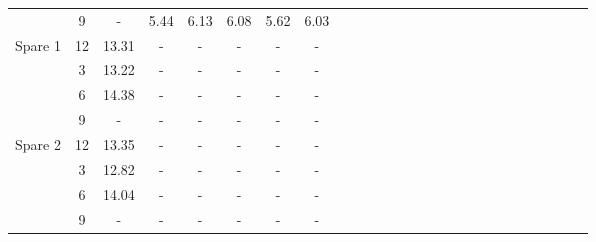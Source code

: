 \begin{table}[h]
{\begin{tabular}{l|l|l|l|l|l|l|lllllllllllllllllll}
			\multicolumn{1}{c|}{} & \multicolumn{1}{c|}{9} & \multicolumn{1}{c|}{-} & \multicolumn{1}{c|}{5.44} & \multicolumn{1}{c|}{6.13} & \multicolumn{1}{c|}{6.08} & \multicolumn{1}{c|}{5.62} & \multicolumn{1}{c}{6.03} &  &  &  &  &  &  &  &  &  &  &  &  &  &  &  &  &  &  \\ 
			\cline{1-8}
			\multicolumn{1}{c|}{Spare 1} & \multicolumn{1}{c|}{12} & \multicolumn{1}{c|}{13.31} & \multicolumn{1}{c|}{-} & \multicolumn{1}{c|}{-} & \multicolumn{1}{c|}{-} & \multicolumn{1}{c|}{-} & \multicolumn{1}{c}{-} &  &  &  &  &  &  &  &  &  &  &  &  &  &  &  &  &  &  \\ 
			\multicolumn{1}{c|}{} & \multicolumn{1}{c|}{3} & \multicolumn{1}{c|}{13.22} & \multicolumn{1}{c|}{-} & \multicolumn{1}{c|}{-} & \multicolumn{1}{c|}{-} & \multicolumn{1}{c|}{-} & \multicolumn{1}{c}{-} &  &  &  &  &  &  &  &  &  &  &  &  &  &  &  &  &  &  \\ 
			\multicolumn{1}{c|}{} & \multicolumn{1}{c|}{6} & \multicolumn{1}{c|}{14.38} & \multicolumn{1}{c|}{-} & \multicolumn{1}{c|}{-} & \multicolumn{1}{c|}{-} & \multicolumn{1}{c|}{-} & \multicolumn{1}{c}{-} &  &  &  &  &  &  &  &  &  &  &  &  &  &  &  &  &  &  \\ 
			\multicolumn{1}{c|}{} & \multicolumn{1}{c|}{9} & \multicolumn{1}{c|}{-} & \multicolumn{1}{c|}{-} & \multicolumn{1}{c|}{-} & \multicolumn{1}{c|}{-} & \multicolumn{1}{c|}{-} & \multicolumn{1}{c}{-} &  &  &  &  &  &  &  &  &  &  &  &  &  &  &  &  &  &  \\ 
			\cline{1-8}
			\multicolumn{1}{c|}{Spare 2} & \multicolumn{1}{c|}{12} & \multicolumn{1}{c|}{13.35} & \multicolumn{1}{c|}{-} & \multicolumn{1}{c|}{-} & \multicolumn{1}{c|}{-} & \multicolumn{1}{c|}{-} & \multicolumn{1}{c}{-} &  &  &  &  &  &  &  &  &  &  &  &  &  &  &  &  &  &  \\ 
			\multicolumn{1}{c|}{} & \multicolumn{1}{c|}{3} & \multicolumn{1}{c|}{12.82} & \multicolumn{1}{c|}{-} & \multicolumn{1}{c|}{-} & \multicolumn{1}{c|}{-} & \multicolumn{1}{c|}{-} & \multicolumn{1}{c}{-} &  &  &  &  &  &  &  &  &  &  &  &  &  &  &  &  &  &  \\ 
			\multicolumn{1}{c|}{} & \multicolumn{1}{c|}{6} & \multicolumn{1}{c|}{14.04} & \multicolumn{1}{c|}{-} & \multicolumn{1}{c|}{-} & \multicolumn{1}{c|}{-} & \multicolumn{1}{c|}{-} & \multicolumn{1}{c}{-} &  &  &  &  &  &  &  &  &  &  &  &  &  &  &  &  &  &  \\ 
			\multicolumn{1}{c|}{} & \multicolumn{1}{c|}{9} & \multicolumn{1}{c|}{-} & \multicolumn{1}{c|}{-} & \multicolumn{1}{c|}{-} & \multicolumn{1}{c|}{-} & \multicolumn{1}{c|}{-} & \multicolumn{1}{c}{-} &  &  &  &  &  &  &  &  &  &  &  &  &  &  &  &  &  &  \\ 

\end{tabular}}
\end{table}
